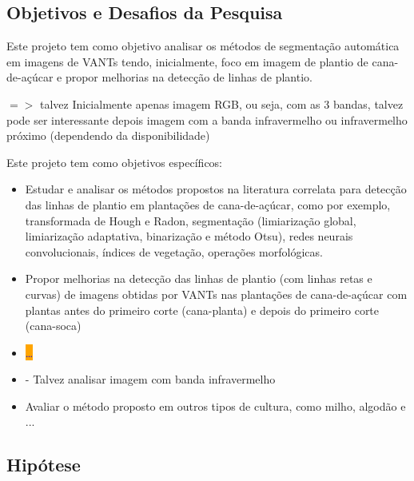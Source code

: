 \documentclass[12pt, a4paper, english, brazil]{article}
\newcommand{\textRed}[1]{{{\color{red} #1}}}
\newcommand{\dotsBlue}{\colorbox{orange}{\textcolor{blue}{\dots}}}
\begin{document}
\subsection{Objetivos e Desafios da Pesquisa}

Este projeto tem como objetivo analisar os métodos de segmentação automática em imagens de VANTs tendo, inicialmente, foco em imagem de plantio de cana-de-açúcar e propor melhorias na detecção de linhas de plantio. 

$=>$ \textRed{talvez} Inicialmente apenas imagem RGB, ou seja, com as 3 bandas, talvez pode ser interessante depois imagem com a banda infravermelho ou infravermelho próximo (dependendo da disponibilidade)

Este projeto tem como objetivos específicos:
\begin{itemize}
    \item Estudar e analisar os métodos propostos na literatura correlata para detecção das linhas de plantio em plantações de cana-de-açúcar, como por exemplo, transformada de Hough e Radon, segmentação (limiarização global, limiarização adaptativa, binarização e método Otsu), redes neurais convolucionais, índices de vegetação, operações morfológicas.
    \item Propor melhorias na detecção das linhas de plantio (com linhas retas e curvas) de imagens obtidas por VANTs nas plantações de cana-de-açúcar com plantas antes do primeiro corte (cana-planta) e depois do primeiro corte (cana-soca)
    \item \dotsBlue
    \item - \textRed{Talvez analisar imagem com banda infravermelho}
    \item Avaliar o método proposto em outros tipos de cultura, como milho, algodão e ...
\end{itemize}

\subsection{Hipótese}
\end{document}

